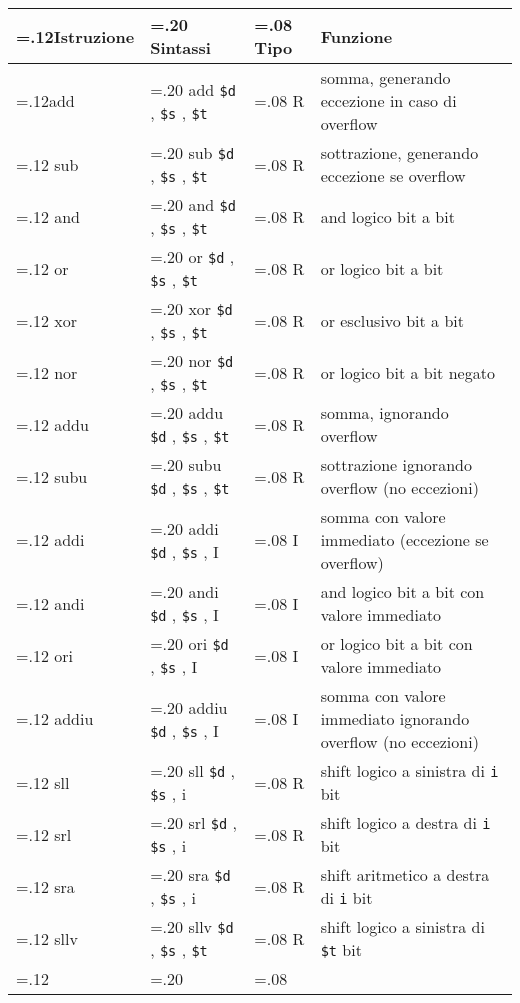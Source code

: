 \documentclass{standalone}
\providecommand\lightrule{%
	\arrayrulecolor{black!30}%
	\midrule[\lightrulewidth]%
	\arrayrulecolor{black}}
\providecommand\register[1]{%
	\texttt{#1}%
}
\begin{document}
\begin{tabularx}{\textwidth}{ >{\hsize=.12\textwidth}X >{\hsize=.20\textwidth}X >{\hsize=.08\textwidth}X X }
	\toprule
		Istruzione & Sintassi & Tipo & Funzione \\
	\midrule
		add & add \register{\$d}, \register{\$s}, \register{\$t} & R & somma, generando eccezione in caso di overflow \\\lightrule
		sub & sub \register{\$d}, \register{\$s}, \register{\$t} & R & sottrazione, generando eccezione se overflow \\\lightrule
		and & and \register{\$d}, \register{\$s}, \register{\$t} & R & and logico bit a bit \\\lightrule
		or & or \register{\$d}, \register{\$s}, \register{\$t} & R & or logico bit a bit \\\lightrule
		xor & xor \register{\$d}, \register{\$s}, \register{\$t} & R & or esclusivo bit a bit \\\lightrule
		nor & nor \register{\$d}, \register{\$s}, \register{\$t} & R & or logico bit a bit negato \\\lightrule
		addu & addu \register{\$d}, \register{\$s}, \register{\$t} & R & somma, ignorando overflow \\\lightrule
		subu & subu \register{\$d}, \register{\$s}, \register{\$t} & R & sottrazione ignorando overflow (no eccezioni) \\\lightrule
		addi & addi \register{\$d}, \register{\$s}, I & I & somma con valore immediato (eccezione se overflow) \\\lightrule
		andi & andi \register{\$d}, \register{\$s}, I & I & and logico bit a bit con valore immediato \\\lightrule
		ori & ori \register{\$d}, \register{\$s}, I & I & or logico bit a bit con valore immediato \\\lightrule
		addiu &  addiu \register{\$d}, \register{\$s}, I & I & somma con valore immediato ignorando overflow (no eccezioni) \\\lightrule
		sll & sll \register{\$d}, \register{\$s}, i & R & shift logico a sinistra di \register{i} bit \\\lightrule
		srl & srl \register{\$d}, \register{\$s}, i & R & shift logico a destra di \register{i} bit \\\lightrule
		sra & sra \register{\$d}, \register{\$s}, i & R & shift aritmetico a destra di \register{i} bit \\\lightrule
		sllv & sllv \register{\$d}, \register{\$s}, \register{\$t} & R & shift logico a sinistra di \register{\$t} bit \\\lightrule

\end{tabularx}
\end{document}
